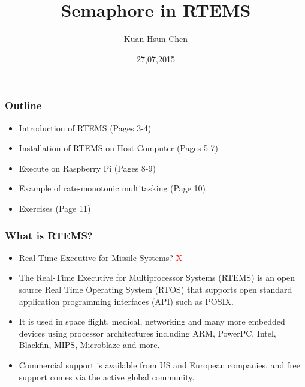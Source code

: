 \documentclass[t]{beamer}
\title{Semaphore in RTEMS}
\author{Kuan-Hsun Chen}
\institute{LS 12, TU Dortmund}
\date{27,07,2015}
\newcommand{\red}[1]{\textcolor{red}{#1}}
\begin{document}
\maketitle

\begin{frame}
\frametitle{Outline}

\begin{itemize}

\item Introduction of RTEMS (Pages 3-4)
\label{sec-1-1}%

\item Installation of RTEMS on Host-Computer (Pages 5-7)
\label{sec-1-2}%

\item Execute on Raspberry Pi (Pages 8-9)
\label{sec-1-3}%

\item Example of rate-monotonic multitasking (Page 10)
\label{sec-1-3}%

\item Exercises (Page 11)
\label{sec-1-4}%

\end{itemize} %
\end{frame}

\begin{frame}
\frametitle{What is RTEMS?}
\label{sec-2}
\begin{itemize}

\item Real-Time Executive for Missile Systems? \red{X}
\label{sec-2-1}%
\item The Real-Time Executive for Multiprocessor Systems (RTEMS) is an open source Real Time Operating System (RTOS) that supports open standard application programming interfaces (API) such as POSIX. 
\label{sec-2-2}%
\item It is used in space flight, medical, networking and many more embedded devices using processor 
architectures including ARM, PowerPC, Intel, Blackfin, MIPS, Microblaze and more. 
\label{sec-2-3}%
\item Commercial support is available from US and European companies, and free support comes via the active global community.
\label{sec-2-4}%

\end{itemize} %
\end{frame}
\end{document}
